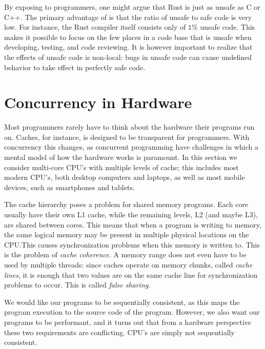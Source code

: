 \documentclass[b5paper]{report}
\begin{document}
By exposing  to programmers, one might argue that Rust is just as
unsafe as C or C++. The primary advantage of  is that the ratio of
unsafe to safe code is very low. For instance, the Rust compiler itself consists
only of $1\%$ unsafe code\cite{rustc-unsafe}. This makes it possible to focus on
the few places in a code base that is unsafe when developing, testing, and code
reviewing. It is however important to realize that the effects of unsafe code is
non-local: bugs in unsafe code can cause undefined behavior to take effect in
perfectly safe code.



\section{Concurrency in Hardware}

Most programmers rarely have to think about the hardware their programs run on.
Caches, for instance, is designed to be transparent for programmers. With
concurrency this changes, as concurrent programming have challenges in which a
mental model of how the hardware works is paramount. In this section we consider
multi-core CPU's with multiple levels of cache; this includes most modern CPU's,
both desktop computers and laptops, as well as most mobile devices, such as
smartphones and tablets.

The cache hierarchy poses a problem for shared memory programs. Each core
usually have their own L1 cache, while the remaining levels, L2 (and maybe L3),
are shared between cores. This means that when a program is writing to memory,
the same logical memory may be present in multiple physical locations on the
CPU.\@ This causes synchronization problems when this memory is written to. This
is the problem of \emph{cache coherence}. A memory range does not even have to
be used by multiple threads: since caches operate on memory chunks, called
\emph{cache lines}, it is enough that two values are on the same cache line for
synchronization problems to occur. This is called \emph{false sharing}.

We would like our programs to be sequentially consistent, as this maps the
program execution to the source code of the program. However, we also want our
programs to be performant, and it turns out that from a hardware perspective
these two requirements are conflicting. CPU's are simply not sequentially
consistent.
\end{document}
